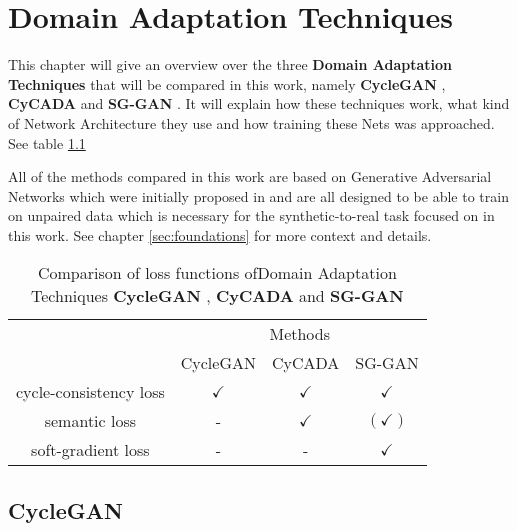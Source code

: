 \chapter{Domain Adaptation Techniques}
\label{sec:techniques}

This chapter will give an overview over the three \textbf{Domain Adaptation Techniques} that will be compared in this work, namely \textbf{CycleGAN} \cite{DBLP:journals/corr/ZhuPIE17}, \textbf{CyCADA} \cite{DBLP:journals/corr/abs-1711-03213} and \textbf{SG-GAN} \cite{DBLP:journals/corr/abs-1801-01726}. It will explain how these techniques work, what kind of Network Architecture they use and how training these Nets was approached. See table \ref{table:DA_comparison}

All of the methods compared in this work are based on Generative Adversarial Networks which were initially proposed in \cite{NIPS2014_5423} and are all designed to be able to train on unpaired data which is necessary for the synthetic-to-real task focused on in this work. See chapter \ref{sec:foundations} for more context and details.

\begin{table}
	\centering
	\begin{tabular}{|c|c|c|c|}
		\multicolumn{1}{c}{} & \multicolumn{3}{c}{Methods}\\
		\cline{2-4}
		\multicolumn{1}{c|}{} & CycleGAN & CyCADA & SG-GAN\\
		\hline
		cycle-consistency loss & $\checkmark$ & $\checkmark$ & $\checkmark$\\
		\hline
		semantic loss & - & $\checkmark$ & $(\checkmark)$\\
		\hline 
		soft-gradient loss & - & - & $\checkmark$\\
		\hline
	\end{tabular} 
	\caption{Comparison of loss functions ofDomain Adaptation Techniques \textbf{CycleGAN} \cite{DBLP:journals/corr/ZhuPIE17}, \textbf{CyCADA} \cite{DBLP:journals/corr/abs-1711-03213} and \textbf{SG-GAN} \cite{DBLP:journals/corr/abs-1801-01726}}
	\label{table:DA_comparison}
\end{table}

\section{CycleGAN} 

